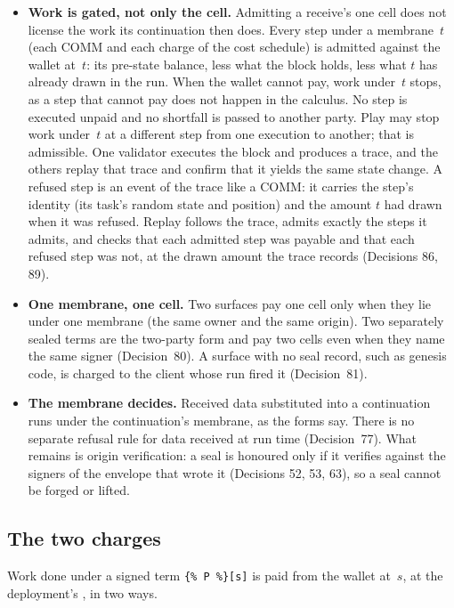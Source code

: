 \documentclass[11pt]{article}
\newcommand{\code}{\path}
\newcommand{\signed}[2]{\texttt{\{\%\,#1\,\%\}[#2]}}
\begin{document}
\begin{itemize}
\item \textbf{Work is gated, not only the cell.} Admitting a receive's one cell does not license the work its continuation then does. Every step under a membrane~$t$ (each COMM and each charge of the cost schedule) is admitted against the wallet at~$t$: its pre-state balance, less what the block holds, less what $t$ has already drawn in the run. When the wallet cannot pay, work under~$t$ stops, as a step that cannot pay does not happen in the calculus. No step is executed unpaid and no shortfall is passed to another party. Play may stop work under~$t$ at a different step from one execution to another; that is admissible. One validator executes the block and produces a trace, and the others replay that trace and confirm that it yields the same state change. A refused step is an event of the trace like a COMM: it carries the step's identity (its task's random state and position) and the amount $t$ had drawn when it was refused. Replay follows the trace, admits exactly the steps it admits, and checks that each admitted step was payable and that each refused step was not, at the drawn amount the trace records (Decisions 86, 89).
\item \textbf{One membrane, one cell.} Two surfaces pay one cell only when they lie under one membrane (the same owner and the same origin). Two separately sealed terms are the two-party form and pay two cells even when they name the same signer (Decision~80). A surface with no seal record, such as genesis code, is charged to the client whose run fired it (Decision~81).
\item \textbf{The membrane decides.} Received data substituted into a continuation runs under the continuation's membrane, as the forms say. There is no separate refusal rule for data received at run time (Decision~77). What remains is origin verification: a seal is honoured only if it verifies against the signers of the envelope that wrote it (Decisions 52, 53, 63), so a seal cannot be forged or lifted.
\end{itemize}

\subsection{The two charges}\label{sec:charges}

Work done under a signed term \signed{P}{s} is paid from the wallet at~$s$, at the deployment's \code{phloPrice}, in two ways.
\end{document}

